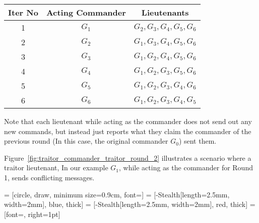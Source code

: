 \documentclass[11pt]{article}
\newcommand{\gen}[1]{\ensuremath{G_{#1}}}
\begin{document}
\noindent
\begin{center}
\begin{tabular}{ccc}
\toprule
\textbf{Iter No} & \textbf{Acting Commander} & \textbf{Lieutenants} \\
\midrule
1 & $\gen{1}$ & $\gen{2}, \gen{3}, \gen{4}, \gen{5}, \gen{6}$ \\
2 & $\gen{2}$ & $\gen{1}, \gen{3}, \gen{4}, \gen{5}, \gen{6}$ \\
3 & $\gen{3}$ & $\gen{1}, \gen{2}, \gen{4}, \gen{5}, \gen{6}$ \\
4 & $\gen{4}$ & $\gen{1}, \gen{2}, \gen{3}, \gen{5}, \gen{6}$ \\
5 & $\gen{5}$ & $\gen{1}, \gen{2}, \gen{3}, \gen{4}, \gen{6}$ \\
6 & $\gen{6}$ & $\gen{1}, \gen{2}, \gen{3}, \gen{4}, \gen{5}$ \\
\bottomrule
\end{tabular}
\label{tab:round_1_iter}
\end{center}


Note that each lieutenant while acting as the commander does not send out any new commands, but instead just reports what they claim the commander of the previous round (In this case, the original commander $\gen{0}$) sent them.

Figure~\ref{fig:traitor_commander_traitor_round_2} illustrates a scenario where a traitor lieutenant, In our example $\gen{1}$, while acting as the commander for Round 1, sends conflicting messages.


 = [circle, draw, minimum size=0.9cm, font=\small]
 = [-{Stealth[length=2.5mm, width=2mm]}, blue, thick] %
 = [-{Stealth[length=2.5mm, width=2mm]}, red, thick]  %
 = [font=\scriptsize, right=1pt]
\end{document}
